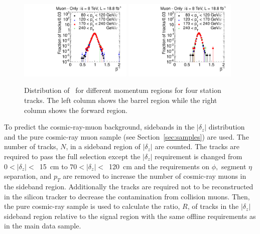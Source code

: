 \begin{figure}
\begin{center}
\includegraphics[clip=false, trim=0.0cm 0cm 0.0cm 0cm, width=0.48\textwidth]{figures/muonly/Control_Data8TeV_Pt_TOFSpectrum_Binned_2}
\includegraphics[clip=false, trim=0.0cm 0cm 0.0cm 0cm, width=0.48\textwidth]{figures/muonly/Control_Data8TeV_Pt_TOFSpectrum_Binned_5}
\caption[Distribution of \invbeta\
  for different momentum regions for four station tracks in the \muononly\ analysis.]
{Distribution of \invbeta\
for different momentum regions for four station tracks.
The  left column shows the barrel region while the right column
shows the forward region.}
\label{fig:MuOnlyControl4}
\end{center}
\end{figure}

To predict the cosmic-ray-muon background, sidebands in the $|\delta_z|$ distribution and the pure cosmic-ray muon sample (see Section~\ref{sec:samples}) are used.
The number of tracks, $N$, in a sideband region of $|\delta_z|$ are counted. The tracks are required to pass the full selection except the $|\delta_z|$ requirement 
is changed from $0 < |\delta_z| <$~15~cm to $70 < |\delta_z| <$~120~cm and
the requirements on $\phi,$ segment $\eta$ separation, and $p_T$ are removed to increase the number of cosmic-ray muons in the sideband region. 
Additionally the tracks
are required not to be reconstructed in the silicon tracker to decrease the contamination from collision muons. 
Then, the pure cosmic-ray sample is used to calculate the ratio, $R$, of tracks in the $|\delta_z|$ sideband region 
relative to the signal region with the same offline requirements as in the main data sample. 


